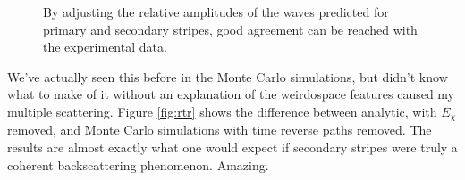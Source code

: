 \begin{figure}
  \centering
  \caption{By adjusting the relative amplitudes of the waves predicted for
    primary and secondary stripes, good agreement can be reached with the
    experimental data.}
  \label{fig:increaseintensity}
\end{figure}
We've actually seen this before in the Monte Carlo simulations, but didn't
know what to make of it without an explanation of the weirdospace features
caused my multiple scattering.  Figure \ref{fig:rtr} shows the difference
between analytic, with $E_\chi$ removed, and Monte Carlo simulations with
time reverse paths removed.  The results are almost exactly what one would
expect if secondary stripes were truly a coherent backscattering
phenomenon.  Amazing.

